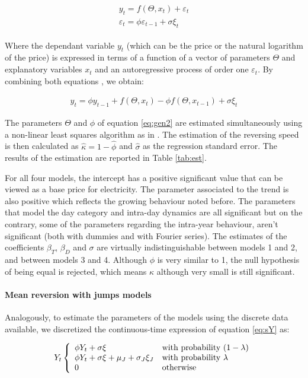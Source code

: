 \documentclass[3p]{elsarticle}
\begin{document}
\begin{align}
\label{eq:gen1}
\begin{split}
y_t=f(\Theta,x_t)+\varepsilon_t\\
\varepsilon_t=\phi \varepsilon_{t-1}+\sigma \xi_t
\end{split}
\end{align}

Where the dependant variable $y_t$ (which can be the price or the natural logarithm of the price) is expressed in terms of a function of a vector of parameters $\Theta$ and explanatory variables $x_t$ and an autoregressive process of order one $\varepsilon_t$. By combining both equations \citep{Lucia2002a}, we obtain:

\begin{align}
\label{eq:gen2}
y_t=\phi y_{t-1}+f(\Theta,x_t)-\phi f(\Theta,x_{t-1})+\sigma \xi_t
\end{align}

The parameters $\Theta$ and $\phi$ of equation \ref{eq:gen2} are estimated simultaneously using a non-linear least squares algorithm as in \citep{Lucia2002a}. The estimation of the reversing speed is then calculated as $\hat{\kappa}=1-\hat{\phi}$ and $\hat{\sigma}$ as the regression standard error. The results of the estimation are reported in Table \ref{tab:est}.

For all four models, the intercept has a positive significant value that can be viewed as a base price for electricity. The parameter associated to the trend is also positive which reflects the growing behaviour noted before. The parameters that model the day category and intra-day dynamics are all significant but on the contrary, some of the parameters regarding the intra-year behaviour, aren't significant (both with dummies and with Fourier series). The estimates of the coefficients $\beta_T$, $\beta_D$ and $\sigma$ are virtually indistinguishable between models 1 and 2, and between models 3 and 4. Although $\phi$ is very similar to 1, the null hypothesis of being equal is rejected, which means $\kappa$ although very small is still significant.

\paragraph{Mean reversion with jumps models}
Analogously, to estimate the parameters of the models using the discrete data available, we discretized the continuous-time expression of equation \ref{eq:sY} as:

\[Y_t\left\{
\begin{array}{ll}
    \phi Y_t+\sigma\xi & \textup{with probability } (1-\lambda) \\
      \phi Y_t+\sigma\xi+\mu_J+\sigma_J\xi_J & \textup{with probability } \lambda \\
      0 & \textup{otherwise} \\
\end{array} 
\right. \]
\end{document}
